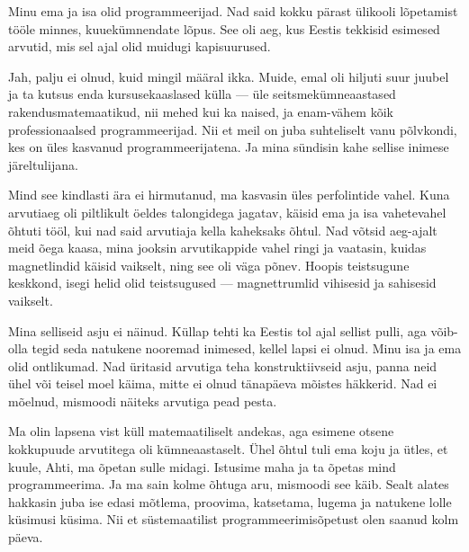 \label{sisu:ahti}

Minu ema ja isa olid 
programmeerijad. Nad said kokku pärast ülikooli lõpetamist tööle minnes, 
kuuekümnendate lõpus. See oli aeg, kus Eestis tekkisid 
esimesed arvutid, mis sel ajal olid muidugi kapisuurused.


Jah, palju ei olnud, kuid 
mingil määral ikka. Muide, emal oli hiljuti  
suur juubel ja ta kutsus enda 
kursusekaaslased külla --- üle seitsmekümneaastased
rakendusmatemaatikud, nii mehed kui ka naised, ja enam-vähem kõik  
professionaalsed programmeerijad. Nii et meil on juba 
suhteliselt vanu põlvkondi, kes on üles kasvanud programmeerijatena. Ja mina 
sündisin kahe sellise inimese järeltulijana.


Mind see kindlasti ära ei hirmutanud, ma kasvasin üles perfolintide vahel. 
Kuna arvutiaeg oli piltlikult öeldes talongidega 
jagatav, käisid ema ja isa vahetevahel
õhtuti tööl, kui nad said arvutiaja kella kaheksaks õhtul. 
Nad võtsid aeg-ajalt meid õega kaasa, mina jooksin arvutikappide vahel ringi ja 
vaatasin, kuidas 
magnetlindid käisid vaikselt, ning see oli väga põnev. 
Hoopis teistsugune keskkond, isegi helid olid teistsugused --- magnettrumlid 
vihisesid ja sahisesid vaikselt.


Mina selliseid asju ei näinud. Küllap tehti ka Eestis tol ajal 
sellist pulli, aga võib-olla tegid seda natukene nooremad inimesed, kellel 
lapsi ei olnud. Minu isa ja ema olid ontlikumad. Nad 
üritasid arvutiga teha konstruktiivseid asju, panna neid 
ühel või teisel moel käima, mitte ei olnud tänapäeva mõistes häkkerid. Nad ei 
mõelnud, mismoodi näiteks arvutiga pead pesta.


Ma olin lapsena vist küll matemaatiliselt andekas, aga esimene otsene kokkupuude
arvutitega oli kümneaastaselt. Ühel õhtul tuli ema koju ja 
ütles, et kuule, Ahti, ma õpetan sulle midagi. Istusime maha ja 
ta õpetas mind programmeerima. Ja ma sain 
kolme õhtuga aru, mismoodi see käib. Sealt 
alates hakkasin juba ise edasi mõtlema, proovima, katsetama, lugema ja 
natukene lolle küsimusi küsima. Nii et süstemaatilist 
programmeerimisõpetust olen saanud kolm päeva.

